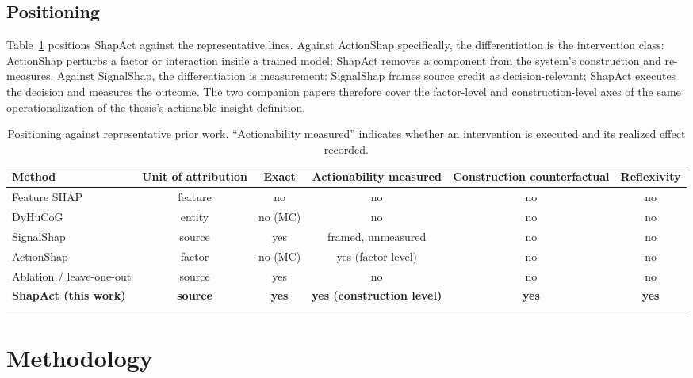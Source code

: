 \documentclass[pdflatex,sn-mathphys-num]{sn-jnl}
\theoremstyle{thmstyleone}%
\theoremstyle{thmstyletwo}%
\theoremstyle{thmstylethree}%
\begin{document}
\subsection{Positioning}\label{subsec2_4}

Table~\ref{tab1} positions ShapAct against the representative lines. Against ActionShap specifically, the differentiation is the intervention class: ActionShap perturbs a factor or interaction inside a trained model; ShapAct removes a component from the system's construction and re-measures. Against SignalShap, the differentiation is measurement: SignalShap frames source credit as decision-relevant; ShapAct executes the decision and measures the outcome. The two companion papers therefore cover the factor-level and construction-level axes of the same operationalization of the thesis's actionable-insight definition.

\begin{table}[h]
\caption{Positioning against representative prior work. ``Actionability measured'' indicates whether an intervention is executed and its realized effect recorded.}
\label{tab1}
\begin{tabular*}{\textwidth}{@{\extracolsep\fill}lccccc}
\toprule
Method & Unit of attribution & Exact & Actionability measured & Construction counterfactual & Reflexivity \\
\midrule
Feature SHAP \cite{louhichi2023,louhichi2025} & feature & no & no & no & no \\
DyHuCoG \cite{louhichi2026} & entity & no (MC) & no & no & no \\
SignalShap \cite{louhichi2026signalshap} & source & yes & framed, unmeasured & no & no \\
ActionShap \cite{louhichi2026actionshap} & factor & no (MC) & yes (factor level) & no & no \\
Ablation / leave-one-out & source & yes & no & no & no \\
\textbf{ShapAct (this work)} & \textbf{source} & \textbf{yes} & \textbf{yes (construction level)} & \textbf{yes} & \textbf{yes} \\
\botrule
\end{tabular*}
\end{table}

\section{Methodology}\label{sec3}
\end{document}
